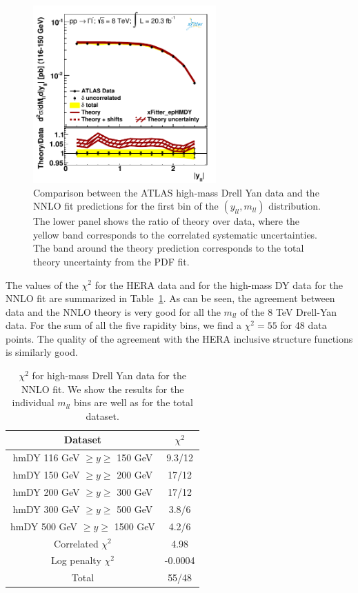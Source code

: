 \begin{figure}[h]
\centering
\includegraphics[width=7cm]{figs/data_1.pdf} 
\caption{Comparison between the ATLAS high-mass Drell Yan data and the NNLO fit predictions
  for the first bin of the $(y_{ll},m_{ll})$ distribution.
  The lower panel shows the ratio of theory over data, where the yellow band
  corresponds to the correlated systematic uncertainties.
  The band around the theory prediction corresponds to the total
  theory uncertainty from the PDF fit.
}
\label{hmDY_2D}
\end{figure}

The values of the $\chi^2$ for the HERA data and for
the high-mass DY data for the NNLO fit
are summarized in Table~\ref{tab:chi2fit}.
%
As can be seen, the agreement between data and the NNLO theory
is very good for all the $m_{ll}$ of the 8 TeV Drell-Yan data.
%
For the sum of all the five rapidity bins, we find a $\chi^2=55$
for 48 data points.
%
The quality of the agreement with the HERA inclusive structure functions
is similarly good.

\begin{table}[h]
  \centering
  \begin{tabular}{|c|c|}
    \hline
    Dataset  &   $\chi^2$ \\
    \hline
    \hline
    hmDY  116 GeV $\ge y\ge $ 150 GeV  &  9.3/12 \\
    hmDY  150 GeV $\ge y\ge $ 200 GeV  &  17/12 \\
    hmDY  200 GeV $\ge y\ge $ 300 GeV  &  17/12 \\
    hmDY  300 GeV $\ge y\ge $ 500 GeV  &  3.8/6 \\
    hmDY  500 GeV $\ge y\ge $ 1500 GeV  &  4.2/6 \\
    \hline
    Correlated $\chi^2$ & 4.98 \\
    Log penalty $\chi^2$  & -0.0004 \\
    \hline
    \hline
    Total  & 55/48 \\
    \hline
    \end{tabular}
  \caption{$\chi^{2}$ for high-mass Drell Yan data for the NNLO fit.
    We show the results for the individual $m_{ll}$ bins
    are well as for the total dataset.
\label{tab:chi2fit}
  }
\end{table}


